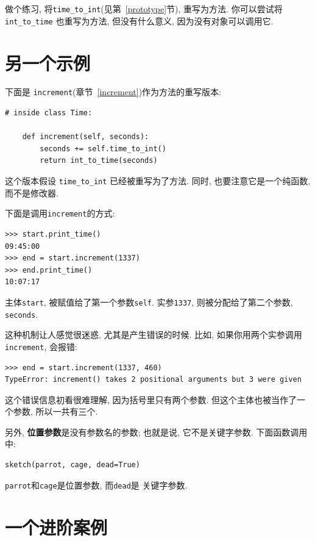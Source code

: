 \documentclass[10pt]{book}
\begin{document}
做个练习, 将\verb"time_to_int"(见第~\ref{prototype}节), 重写为方法. 
你可以尝试将\verb"int_to_time" 也重写为方法, 但没有什么意义, 
因为没有对象可以调用它. 


\section{另一个示例}

下面是 {\tt increment}(章节~\ref{increment})作为方法的重写版本:

\begin{verbatim}
# inside class Time:

    def increment(self, seconds):
        seconds += self.time_to_int()
        return int_to_time(seconds)
\end{verbatim}
%
这个版本假设 \verb"time_to_int" 已经被重写为了方法. 
同时, 也要注意它是一个纯函数, 而不是修改器. 

下面是调用{\tt increment}的方式:

\begin{verbatim}
>>> start.print_time()
09:45:00
>>> end = start.increment(1337)
>>> end.print_time()
10:07:17
\end{verbatim}
%
主体{\tt start}, 被赋值给了第一个参数{\tt self}. 
实参{\tt 1337}, 则被分配给了第二个参数, {\tt seconds}. 

这种机制让人感觉很迷惑, 尤其是产生错误的时候. 
比如, 如果你用两个实参调用{\tt increment}, 会报错:

\begin{verbatim}
>>> end = start.increment(1337, 460)
TypeError: increment() takes 2 positional arguments but 3 were given
\end{verbatim}
%
这个错误信息初看很难理解, 因为括号里只有两个参数. 
但这个主体也被当作了一个参数, 所以一共有三个. 

另外, {\bf 位置参数}是没有参数名的参数;
也就是说, 它不是关键字参数. 
下面函数调用中:

\begin{verbatim}
sketch(parrot, cage, dead=True)
\end{verbatim}

{\tt parrot}和{\tt cage}是位置参数, 而{\tt dead}是
关键字参数.


\section{一个进阶案例}
\end{document}
